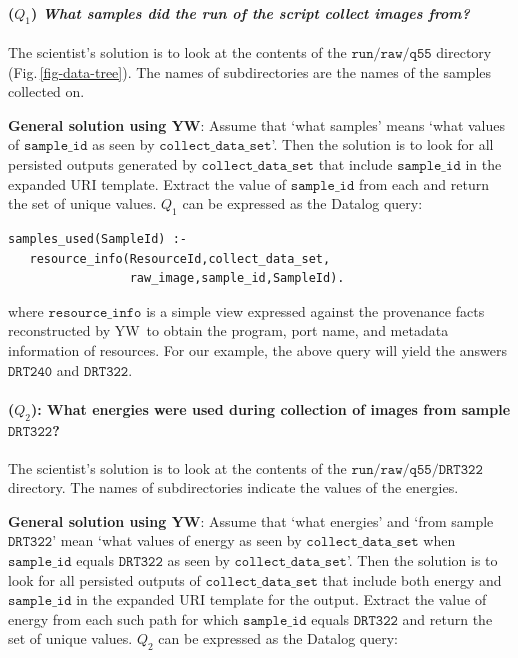 \documentclass[nocopyrightspace]{sigplanconf}
\newcommand{\figref}[1]{Fig.\,\ref{#1}}
\newcommand{\code}[1]{\ensuremath{\mathtt{#1}}}
\newcommand{\yw}{\textsf{YW}}
\begin{document}
\paragraph{($Q_1$) \emph{What samples did the run of the script
  collect images from?}} 
The scientist's solution is to look at the contents of the
\code{run/raw/q55} directory (\figref{fig-data-tree}). The names of
subdirectories are the names of the samples collected on.

\textbf{General solution using \yw}: Assume that `what samples' means
`what values of \code{sample\_id} as seen by
\code{collect\_data\_set}'. Then the solution is to look for all
persisted outputs generated by \code{collect\_data\_set} that include
\code{sample\_id} in the expanded URI template.  Extract the value of
\code{sample\_id} from each and return the set of unique values. $Q_1$
can be expressed as the Datalog query:
\begin{small}
\begin{verbatim}
samples_used(SampleId) :- 
   resource_info(ResourceId,collect_data_set,
                 raw_image,sample_id,SampleId).
\end{verbatim}
\end{small}
where \code{resource\_info} is a simple view expressed against the
provenance facts reconstructed by \yw\ to obtain the program, port
name, and metadata information of resources.  For our example, the
above query will yield the answers \code{DRT240} and \code{DRT322}.


\paragraph{($Q_2$): What energies were used during collection of
  images from sample \code{DRT322}?}
The scientist's solution is to look at the contents of the
\code{run/raw/q55/DRT322} directory. The names of subdirectories indicate
the values of the energies.

\textbf{General solution using \yw}: Assume that `what energies' and
`from sample \code{DRT322}' mean `what values of energy as seen by
\code{collect\_data\_set} when \code{sample\_id} equals \code{DRT322}
as seen by \code{collect\_data\_set}'.  Then the solution is to look
for all persisted outputs of \code{collect\_data\_set} that include
both energy and \code{sample\_id} in the expanded URI template for the
output.  Extract the value of energy from each such path for which
\code{sample\_id} equals \code{DRT322} and return the set of unique
values. $Q_2$ can be expressed as the Datalog query: 
\end{document}
